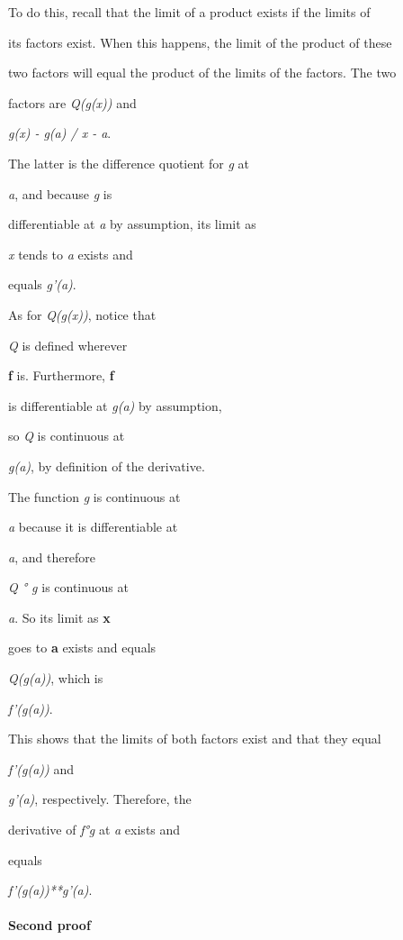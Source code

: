 {To do this, recall that the limit of a product exists if the limits of

its factors exist. When this happens, the limit of the product of these

two factors will equal the product of the limits of the factors. The two

factors are \textit{Q(g(x))} and

\textit{g(x) - g(a) / x - a}.

The latter is the difference quotient for \textit{g} at

\textit{a}, and because \textit{g} is

differentiable at \textit{a} by assumption, its limit as

\textit{x} tends to \textit{a} exists and

equals \textit{g'(a)}.



As for \textit{Q(g(x))}, notice that

\textit{Q} is defined wherever

\textbf{f} is. Furthermore, \textbf{f}

is differentiable at \textit{g(a)} by assumption,

so \textit{Q} is continuous at

\textit{g(a)}, by definition of the derivative.

The function \textit{g} is continuous at

\textit{a} because it is differentiable at

\textit{a}, and therefore

\textit{Q ° g} is continuous at

\textit{a}. So its limit as \textbf{x}

goes to \textbf{a} exists and equals

\textit{Q(g(a))}, which is

\textit{f'(g(a))}.



This shows that the limits of both factors exist and that they equal

\textit{f'(g(a))} and

\textit{g'(a)}, respectively. Therefore, the

derivative of \textit{f°g} at \textit{a} exists and

equals

\textit{f'(g(a))**g'(a)}.



\paragraph{Second proof}



}
